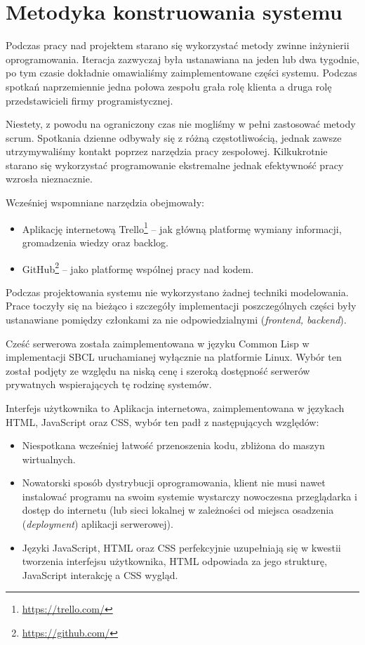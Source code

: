 \section{Metodyka konstruowania systemu}
Podczas pracy nad projektem starano się wykorzystać metody zwinne inżynierii oprogramowania. Iteracja zazwyczaj była ustanawiana na jeden lub dwa tygodnie, po tym czasie dokładnie omawialiśmy zaimplementowane części systemu. Podczas spotkań naprzemiennie jedna połowa zespołu grała rolę klienta a druga rolę przedstawicieli firmy programistycznej.

Niestety, z powodu na ograniczony czas nie mogliśmy w pełni zastosować metody scrum. Spotkania dzienne odbywały się z różną częstotliwością, jednak zawsze utrzymywaliśmy kontakt poprzez narzędzia pracy zespołowej. Kilkukrotnie starano się wykorzystać programowanie ekstremalne jednak efektywność pracy wzrosła nieznacznie.

Wcześniej wspomniane narzędzia obejmowały:
\begin{itemize}
  \item Aplikację internetową Trello\footnote{\url{https://trello.com/}} -- jak główną platformę wymiany informacji, gromadzenia wiedzy oraz backlog.
  \item GitHub\footnote{\url{https://github.com/}} -- jako platformę wspólnej pracy nad kodem.
  \end{itemize}

Podczas projektowania systemu nie wykorzystano żadnej techniki modelowania. Prace toczyły się na bieżąco i szczegóły implementacji poszczególnych części były ustanawiane pomiędzy członkami za nie odpowiedzialnymi (\emph{frontend, backend}).

Cześć serwerowa została zaimplementowana w języku Common Lisp w implementacji SBCL uruchamianej wyłącznie na platformie Linux. Wybór ten został podjęty ze względu na niską cenę i szeroką dostępność serwerów prywatnych wspierających tę rodzinę systemów.

Interfejs użytkownika to Aplikacja internetowa, zaimplementowana w językach HTML, JavaScript oraz CSS, wybór ten padł z następujących względów:
\begin{itemize}
  \item Niespotkana wcześniej łatwość przenoszenia kodu, zbliżona do maszyn wirtualnych.
  \item Nowatorski sposób dystrybucji oprogramowania, klient nie musi nawet instalować programu na swoim systemie wystarczy nowoczesna przeglądarka i dostęp do internetu (lub sieci lokalnej w zależności od miejsca osadzenia (\emph{deployment}) aplikacji serwerowej).
  \item Języki JavaScript, HTML oraz CSS perfekcyjnie uzupełniają się w kwestii tworzenia interfejsu użytkownika, HTML odpowiada za jego strukturę, JavaScript interakcję a CSS wygląd.
\end{itemize}
